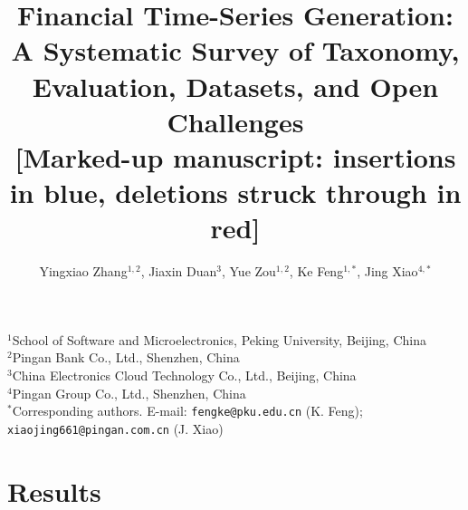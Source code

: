 \documentclass[11pt,a4paper]{article}
\title{\Large\textbf{Financial Time-Series Generation: A Systematic Survey of Taxonomy, Evaluation, Datasets, and Open Challenges}\\[0.4em]\normalsize\textbf{[Marked-up manuscript: insertions in blue, deletions struck through in red]}}
\author{
  Yingxiao Zhang$^{1,2}$, 
  Jiaxin Duan$^{3}$, 
  Yue Zou$^{1,2}$, 
  Ke Feng$^{1,*}$, 
  Jing Xiao$^{4,*}$
}
\date{}
\begin{document}
\maketitle

\vspace{-2em}
\begin{center}
\footnotesize
$^{1}$School of Software and Microelectronics, Peking University, Beijing, China\\[0.3em]
$^{2}$Pingan Bank Co., Ltd., Shenzhen, China\\[0.3em]
$^{3}$China Electronics Cloud Technology Co., Ltd., Beijing, China\\[0.3em]
$^{4}$Pingan Group Co., Ltd., Shenzhen, China\\[0.5em]
$^{*}$Corresponding authors. E-mail: \texttt{fengke@pku.edu.cn} (K. Feng); \texttt{xiaojing661@pingan.com.cn} (J. Xiao)
\end{center}
\vspace{1.5em}





\section{Results}














\newpage
\providecommand{\bibcommenthead}{}



\newpage


\newpage

\end{document}

